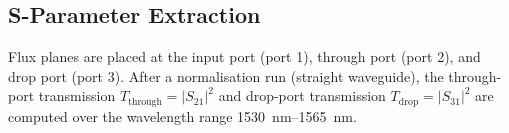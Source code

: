 \subsection{S-Parameter Extraction}
Flux planes are placed at the input port (port 1), through port (port 2),
and drop port (port 3).  After a normalisation run (straight waveguide),
the through-port transmission $T_\text{through} = |S_{21}|^2$ and
drop-port transmission $T_\text{drop} = |S_{31}|^2$ are computed over
the wavelength range \SIrange{1530}{1565}{\nano\meter}.
